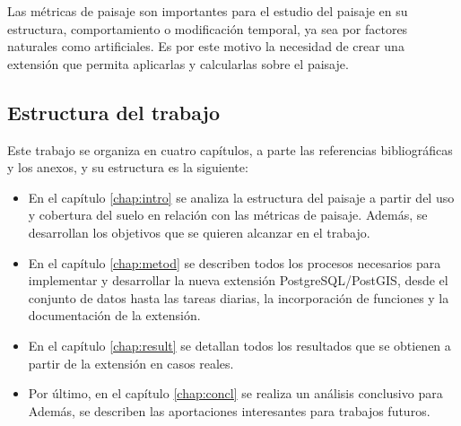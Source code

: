 \begin{prologo}
Las métricas de paisaje son importantes para el estudio del paisaje en su estructura, comportamiento o modificación temporal, ya sea por factores naturales como artificiales. Es por este motivo la necesidad de crear una extensión que permita aplicarlas y calcularlas sobre el paisaje.\\

\subsection*{Estructura del trabajo}
Este trabajo se organiza en cuatro capítulos, a parte las referencias bibliográficas y los anexos, y su estructura es la siguiente:
\begin{itemize}
\item En el capítulo \ref{chap:intro} se analiza la estructura del paisaje a partir del uso y cobertura del suelo en relación con las métricas de paisaje. Además, se desarrollan los objetivos que se quieren alcanzar en el trabajo.

\item En el capítulo \ref{chap:metod} se describen todos los procesos necesarios para implementar y desarrollar la nueva extensión PostgreSQL/PostGIS, desde el conjunto de datos hasta las tareas diarias, la incorporación de funciones y la documentación de la extensión.

\item En el capítulo \ref{chap:result} se detallan todos los resultados que se obtienen a partir de la extensión en casos reales.

\item Por último, en el capítulo \ref{chap:concl} se realiza un análisis conclusivo para  Además, se describen las aportaciones interesantes para trabajos futuros.
\end{itemize}



\end{prologo}
